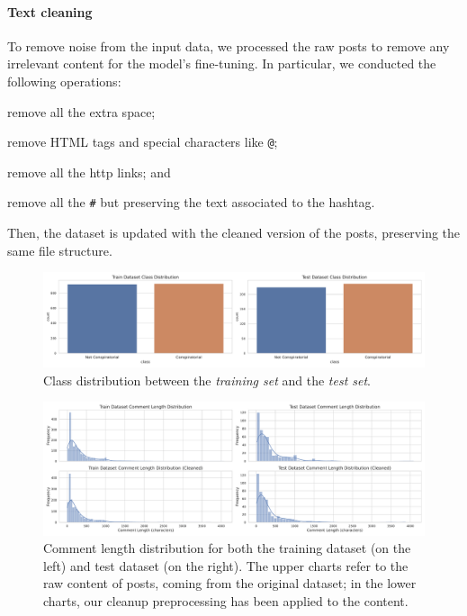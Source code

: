\documentclass[11pt]{article}
\begin{document}
\paragraph{Text cleaning}
To remove noise from the input data,
we processed the raw posts to remove any irrelevant content for the model's fine-tuning.
%
In particular,
we conducted the following operations:
\begin{enumerate*}[label=(\roman{*})]
  \item remove all the extra space;
  \item remove HTML tags and special characters like \texttt{@};
  \item remove all the http links; and
  \item remove all the \texttt{\#} but preserving the text associated to the hashtag.
\end{enumerate*}
Then,
the dataset is updated with the cleaned version of the posts,
preserving the same file structure.


\begin{figure}
  \centering
  \includegraphics[width=\textwidth]{figures/class_distribution.pdf}
  \caption{
    Class distribution between the \emph{training set} and the \emph{test set}.
  }
  \label{fig:class-frequency}
\end{figure}

\begin{figure}
  \centering
  \includegraphics[width=\textwidth]{figures/comment_length_distribution.pdf}
  \caption{
    Comment length distribution for both the training dataset (on the left) and test dataset
    (on the right).
    The upper charts refer to the raw content of posts, coming from the original dataset;
    in the lower charts, our cleanup preprocessing has been applied to the content.
  }
  \label{fig:words-distribution}
\end{figure}
\end{document}
